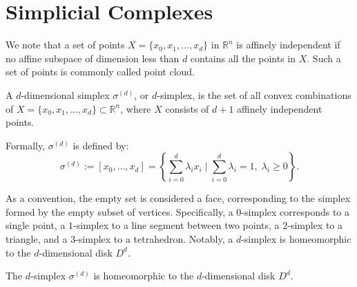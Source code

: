 \section{Simplicial Complexes}
\label{Simplicial Complexes} We note that a set of points
$X = \{x_{0}, x_{1}, \ldots, x_{d}\}$ in $\mathbb{R}^{n}$ is affinely
independent if no affine subspace
of dimension less than $d$ contains all the points in $X$. Such a set of points is
commonly called point cloud.

\begin{definition}[$d$-simplex]{\cite[Definition 2.1]{boissonnat2018geometric}}
	\label{d-simplex} A $d$-dimensional
	simplex $\sigma^{(d)}$, or $d$-simplex, is the set of all convex combinations
	of $X = \{x_{0}, x_{1}, \ldots, x_{d}\} \subset \mathbb{R}^{n}$, where
	$X$ consists of $d+1$ affinely independent points.
						
	Formally, $\sigma^{(d)}$ is
	defined by:
	\begin{equation}
		\sigma^{(d)}:= [x_0, \ldots, x_d] = \left\{\sum_{i=0}^{d}\lambda_{i} x_{i} \; \bigg\vert \; \sum_{i=0}^{d}\lambda
		_{i} = 1, \; \lambda_{i} \geq 0\right\}.
	\end{equation}
\end{definition}

As a convention, the empty set is considered a face, corresponding
to the simplex formed by the empty subset of vertices. Specifically, a $0$-simplex
corresponds to a single point, a $1$-simplex to a line segment between two
points, a $2$-simplex to a triangle, and a $3$-simplex to a tetrahedron. Notably,
a $d$-simplex is homeomorphic to the $d$-dimensional disk $D^{d}$.

\begin{theorem}
	The $d$-simplex $\sigma^{(d)}$ is homeomorphic to the $d$-dimensional disk $D^{d}$.
\end{theorem}

